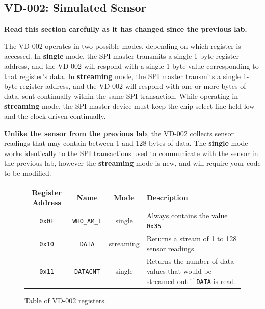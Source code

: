 \documentclass{article}
\begin{document}
\subsection{VD-002: Simulated Sensor}

\textbf{Read this section carefully as it has changed since the previous lab.}

The VD-002 operates in two possible modes, depending on which register is
accessed. In \textbf{single} mode, the SPI master transmits a single 1-byte
register address, and the VD-002 will respond with a single 1-byte value
corresponding to that register's data. In \textbf{streaming} mode, the SPI
master transmits a single 1-byte register address, and the VD-002 will respond
with one or more bytes of data, sent continually within the same SPI
transaction. While operating in \textbf{streaming} mode, the SPI master device
must keep the chip select line held low and the clock driven continually.

\textbf{Unlike the sensor from the previous lab}, the VD-002 collects sensor
readings that may contain between 1 and 128 bytes of data. The \textbf{single}
mode works identically to the SPI transactions used to communicate with the
sensor in the previous lab, however the \textbf{streaming} mode is new, and
will require your code to be modified.

\begin{figure}[H]

	\centering

	\begin{tabular}{c | c | c | p{}}

		Register Address & Name & Mode & Description \\ \hline\hline

		\texttt{0x0F} & \texttt{WHO\_AM\_I} & single & Always contains the value \texttt{0x35} \\ \hline

		\texttt{0x10} & \texttt{DATA} & streaming & Returns a stream of 1 to 128 sensor readings. \\ \hline

		\texttt{0x11} & \texttt{DATACNT} & single & Returns the number of data values that would be streamed out if \texttt{DATA} is read. \\

	\end{tabular}

	\caption{Table of VD-002 registers.}

\end{figure}
\end{document}
